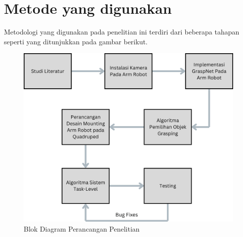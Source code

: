 \section{Metode yang digunakan}

Metodologi yang digunakan pada penelitian ini terdiri dari beberapa tahapan seperti yang
ditunjukkan pada gambar berikut.

\begin{figure} [H] \centering
  \includegraphics[scale=0.4]{gambar/Blok Diagram Metodologi.png}
  \caption{Blok Diagram Perancangan Penelitian}
  \label{fig:diagram_metode}
\end{figure}

